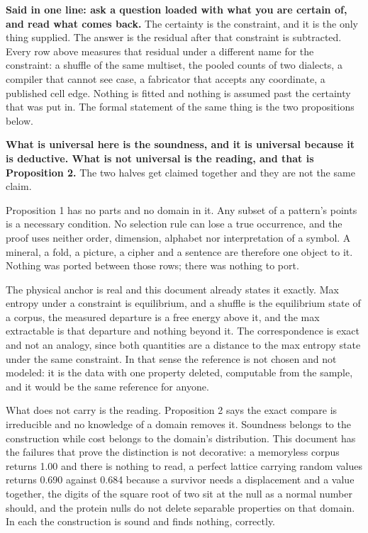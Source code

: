 \textbf{Said in one line: ask a question loaded with what you are certain of, and read what comes back.} The certainty is the constraint, and it is the only thing supplied. The answer is the residual after that constraint is subtracted. Every row above measures that residual under a different name for the constraint: a shuffle of the same multiset, the pooled counts of two dialects, a compiler that cannot see case, a fabricator that accepts any coordinate, a published cell edge. Nothing is fitted and nothing is assumed past the certainty that was put in. The formal statement of the same thing is the two propositions below.

\textbf{What is universal here is the soundness, and it is universal because it is deductive. What is not universal is the reading, and that is Proposition 2.} The two halves get claimed together and they are not the same claim.

Proposition 1 has no parts and no domain in it. Any subset of a pattern's points is a necessary condition. No selection rule can lose a true occurrence, and the proof uses neither order, dimension, alphabet nor interpretation of a symbol. A mineral, a fold, a picture, a cipher and a sentence are therefore one object to it. Nothing was ported between those rows; there was nothing to port.

The physical anchor is real and this document already states it exactly. Max entropy under a constraint is equilibrium, and a shuffle is the equilibrium state of a corpus, the measured departure is a free energy above it, and the max extractable is that departure and nothing beyond it. The correspondence is exact and not an analogy, since both quantities are a distance to the max entropy state under the same constraint. In that sense the reference is not chosen and not modeled: it is the data with one property deleted, computable from the sample, and it would be the same reference for anyone.

What does not carry is the reading. Proposition 2 says the exact compare is irreducible and no knowledge of a domain removes it. Soundness belongs to the construction while cost belongs to the domain's distribution. This document has the failures that prove the distinction is not decorative: a memoryless corpus returns 1.00 and there is nothing to read, a perfect lattice carrying random values returns 0.690 against 0.684 because a survivor needs a displacement and a value together, the digits of the square root of two sit at the null as a normal number should, and the protein nulls do not delete separable properties on that domain. In each the construction is sound and finds nothing, correctly.

